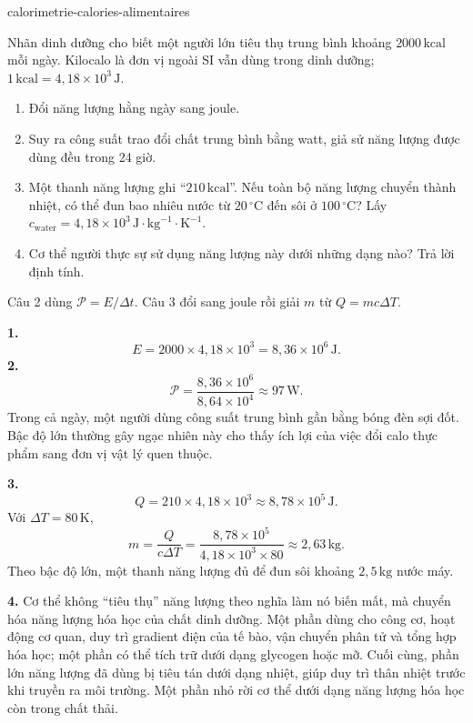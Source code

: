 \begin{exo}{calorimetrie-calories-alimentaires}

Nhãn dinh dưỡng cho biết một người lớn tiêu thụ trung bình khoảng $2000\,\text{kcal}$ mỗi ngày. Kilocalo là đơn vị ngoài SI vẫn dùng trong dinh dưỡng; $1\,\text{kcal}=4{,}18\times10^3\,\text{J}$.
\begin{enumerate}
  \item Đổi năng lượng hằng ngày sang joule.
  \item Suy ra công suất trao đổi chất trung bình bằng watt, giả sử năng lượng được dùng đều trong 24 giờ.
  \item Một thanh năng lượng ghi ``$210\,\text{kcal}$''. Nếu toàn bộ năng lượng chuyển thành nhiệt, có thể đun bao nhiêu nước từ $20\,^\circ\text{C}$ đến sôi ở $100\,^\circ\text{C}$? Lấy $c_{\text{water}}=4{,}18\times10^3\,\text{J}\!\cdot\!\text{kg}^{-1}\!\cdot\!\text{K}^{-1}$.
  \item Cơ thể người thực sự sử dụng năng lượng này dưới những dạng nào? Trả lời định tính.
\end{enumerate}
\begin{indication}
Câu 2 dùng $\mathcal P=E/\Delta t$. Câu 3 đổi sang joule rồi giải $m$ từ $Q=mc\Delta T$.
\end{indication}
\begin{solution}
\textbf{1.}
\[
E=2000\times4{,}18\times10^3=8{,}36\times10^6\,\text{J}.
\]
\textbf{2.}
\[
\mathcal P=\frac{8{,}36\times10^6}{8{,}64\times10^4}\approx97\,\text{W}.
\]
Trong cả ngày, một người dùng công suất trung bình gần bằng bóng đèn sợi đốt. Bậc độ lớn thường gây ngạc nhiên này cho thấy ích lợi của việc đổi calo thực phẩm sang đơn vị vật lý quen thuộc.

\textbf{3.}
\[
Q=210\times4{,}18\times10^3\approx8{,}78\times10^5\,\text{J}.
\]
Với $\Delta T=80\,\text{K}$,
\[
m=\frac{Q}{c\Delta T}
=\frac{8{,}78\times10^5}{4{,}18\times10^3\times80}
\approx2{,}63\,\text{kg}.
\]
Theo bậc độ lớn, một thanh năng lượng đủ để đun sôi khoảng $2{,}5\,\text{kg}$ nước máy.

\textbf{4.} Cơ thể không “tiêu thụ” năng lượng theo nghĩa làm nó biến mất, mà chuyển hóa năng lượng hóa học của chất dinh dưỡng. Một phần dùng cho công cơ, hoạt động cơ quan, duy trì gradient điện của tế bào, vận chuyển phân tử và tổng hợp hóa học; một phần có thể tích trữ dưới dạng glycogen hoặc mỡ. Cuối cùng, phần lớn năng lượng đã dùng bị tiêu tán dưới dạng nhiệt, giúp duy trì thân nhiệt trước khi truyền ra môi trường. Một phần nhỏ rời cơ thể dưới dạng năng lượng hóa học còn trong chất thải.
\end{solution}
\end{exo}
